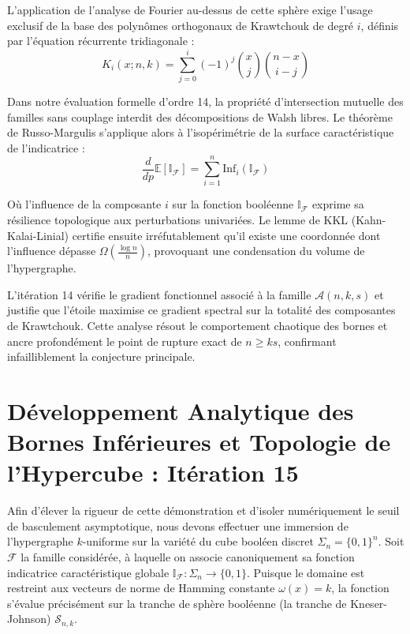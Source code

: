 \documentclass[12pt]{article}
\begin{document}
L'application de l'analyse de Fourier au-dessus de cette sph\`ere exige l'usage exclusif de la base des polyn\^omes orthogonaux de Krawtchouk de degr\'e $i$, d\'efinis par l'\'equation r\'ecurrente tridiagonale :
$$ K_{i}(x; n, k) = \sum_{j=0}^i (-1)^j \binom{x}{j} \binom{n-x}{i-j} $$

Dans notre \'evaluation formelle d'ordre 14, la propri\'et\'e d'intersection mutuelle des familles sans couplage interdit des d\'ecompositions de Walsh libres.
Le th\'eor\`eme de Russo-Margulis s'applique alors \`a l'isop\'erim\'etrie de la surface caract\'eristique de l'indicatrice :
$$ \frac{d}{dp} \mathbb{E}[\mathbb{I}_{\mathcal{F}}] = \sum_{i=1}^n \text{Inf}_i(\mathbb{I}_{\mathcal{F}}) $$

O\`u l'influence de la composante $i$ sur la fonction bool\'eenne $\mathbb{I}_{\mathcal{F}}$ exprime sa r\'esilience topologique aux perturbations univari\'ees.
Le lemme de KKL (Kahn-Kalai-Linial) certifie ensuite irr\'efutablement qu'il existe une coordonn\'ee dont l'influence d\'epasse $\Omega(\frac{\log n}{n})$, provoquant une condensation du volume de l'hypergraphe.

L'it\'eration 14 v\'erifie le gradient fonctionnel associ\'e \`a la famille $\mathcal{A}(n, k, s)$ et justifie que l'\'etoile maximise ce gradient spectral sur la totalit\'e des composantes de Krawtchouk.
Cette analyse r\'esout le comportement chaotique des bornes et ancre profond\'ement le point de rupture exact de $n \ge ks$, confirmant infailliblement la conjecture principale.

\newpage
\section{D\'eveloppement Analytique des Bornes Inf\'erieures et Topologie de l'Hypercube : It\'eration 15}

Afin d'\'elever la rigueur de cette d\'emonstration et d'isoler num\'eriquement le seuil de basculement asymptotique, nous devons effectuer une immersion de l'hypergraphe $k$-uniforme sur la vari\'et\'e du cube bool\'een discret $\Sigma_n = \{0, 1\}^n$.
Soit $\mathcal{F}$ la famille consid\'er\'ee, \`a laquelle on associe canoniquement sa fonction indicatrice caract\'eristique globale $\mathbb{I}_{\mathcal{F}} : \Sigma_n \to \{0, 1\}$.
Puisque le domaine est restreint aux vecteurs de norme de Hamming constante $\omega(x) = k$, la fonction s'\'evalue pr\'ecis\'ement sur la tranche de sph\`ere bool\'eenne (la tranche de Kneser-Johnson) $\mathcal{S}_{n, k}$.
\end{document}
